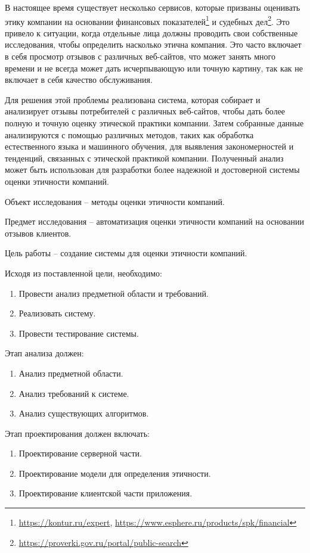 \documentclass{article}
\begin{document}
В настоящее время существует несколько сервисов, которые призваны оценивать этику компании на основании финансовых показателей\footnote{\url{https://kontur.ru/expert}, \url{https://www.esphere.ru/products/spk/financial}} и судебных дел\footnote{\url{https://proverki.gov.ru/portal/public-search}}. Это привело к ситуации, когда отдельные лица должны проводить свои собственные исследования, чтобы определить насколько этична компания. Это часто включает в себя просмотр отзывов с различных веб-сайтов, что может занять много времени и не всегда может дать исчерпывающую или точную картину, так как не включает в себя качество обслуживания.

Для решения этой проблемы реализована система, которая собирает и анализирует отзывы потребителей с различных веб-сайтов, чтобы дать более полную и точную оценку этической практики компании. Затем собранные данные анализируются с помощью различных методов, таких как обработка естественного языка и машинного обучения, для выявления закономерностей и тенденций, связанных с этической практикой компании. Полученный анализ может быть использован для разработки более надежной и достоверной системы оценки этичности компаний.

Объект исследования -- методы оценки этичности компаний.

Предмет исследования -- автоматизация оценки этичности компаний на основании отзывов клиентов.

Цель работы – создание системы для оценки этичности компаний.

Исходя из поставленной цели, необходимо:

\begin{enumerate}
\item Провести анализ предметной области и требований.
\item Реализовать систему.
\item Провести тестирование системы.
\end{enumerate}

Этап анализа должен:
\begin{enumerate}
\item Анализ предметной области.
\item Анализ требований к системе.
\item Анализ существующих алгоритмов.
\end{enumerate}

Этап проектирования должен включать:
\begin{enumerate}
\item Проектирование серверной части.
\item Проектирование модели для определения этичности.
\item Проектирование клиентской части приложения.
\end{enumerate}
\end{document}
